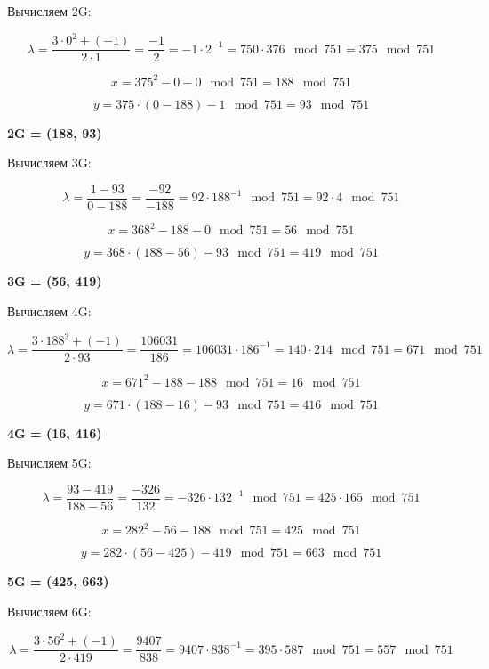 
Вычисляем 2G:

            \[
            \lambda = \frac{ 3 \cdot 0^2 + (-1) }{2 \cdot 1} = \frac{-1}{2} = -1 \cdot 2^{-1} = 750 \cdot 376\mod{751} = 375\mod{751}
            \]
            

        \[
        x = 375^2 - 0 - 0 \mod{751} = 188\mod{751}
        \]
        

        \[
        y = 375 \cdot (0 - 188) - 1\mod{751} = 93\mod{751}
        \]
        
\textbf{2G = (188, 93)}

Вычисляем 3G:

            \[
            \lambda = \frac{1-93}{0-188} = \frac{-92}{-188} = 92 \cdot 188^{-1}\mod{751} = 92 \cdot 4\mod{751}
            \]
            

        \[
        x = 368^2 - 188 - 0 \mod{751} = 56\mod{751}
        \]
        

        \[
        y = 368 \cdot (188 - 56) - 93\mod{751} = 419\mod{751}
        \]
        
\textbf{3G = (56, 419)}

Вычисляем 4G:

            \[
            \lambda = \frac{ 3 \cdot 188^2 + (-1) }{2 \cdot 93} = \frac{106031}{186} = 106031 \cdot 186^{-1} = 140 \cdot 214\mod{751} = 671\mod{751}
            \]
            

        \[
        x = 671^2 - 188 - 188 \mod{751} = 16\mod{751}
        \]
        

        \[
        y = 671 \cdot (188 - 16) - 93\mod{751} = 416\mod{751}
        \]
        
\textbf{4G = (16, 416)}

Вычисляем 5G:

            \[
            \lambda = \frac{93-419}{188-56} = \frac{-326}{132} = -326 \cdot 132^{-1}\mod{751} = 425 \cdot 165\mod{751}
            \]
            

        \[
        x = 282^2 - 56 - 188 \mod{751} = 425\mod{751}
        \]
        

        \[
        y = 282 \cdot (56 - 425) - 419\mod{751} = 663\mod{751}
        \]
        
\textbf{5G = (425, 663)}

Вычисляем 6G:

            \[
            \lambda = \frac{ 3 \cdot 56^2 + (-1) }{2 \cdot 419} = \frac{9407}{838} = 9407 \cdot 838^{-1} = 395 \cdot 587\mod{751} = 557\mod{751}
            \]
            

